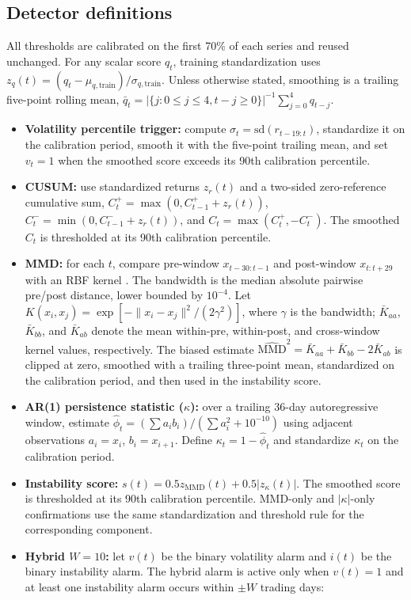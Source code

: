 \documentclass[pdflatex,sn-mathphys-num]{sn-jnl}
\begin{document}
\subsection{Detector definitions}
All thresholds are calibrated on the first 70\% of each series and reused unchanged. For any scalar score $q_t$, training standardization uses $z_q(t)=(q_t-\mu_{q,\mathrm{train}})/\sigma_{q,\mathrm{train}}$. Unless otherwise stated, smoothing is a trailing five-point rolling mean, $\bar q_t=|\{j:0\leq j\leq4,t-j\geq0\}|^{-1}\sum_{j=0}^{4}q_{t-j}$.
\begin{itemize}
\item \textbf{Volatility percentile trigger:} compute $\sigma_t=\mathrm{sd}(r_{t-19:t})$, standardize it on the calibration period, smooth it with the five-point trailing mean, and set $v_t=1$ when the smoothed score exceeds its 90th calibration percentile.
\item \textbf{CUSUM:} use standardized returns $z_r(t)$ and a two-sided zero-reference cumulative sum, $C_t^+=\max(0,C_{t-1}^+ + z_r(t))$, $C_t^-=\min(0,C_{t-1}^- + z_r(t))$, and $C_t=\max(C_t^+,-C_t^-)$. The smoothed $C_t$ is thresholded at its 90th calibration percentile.
\item \textbf{MMD:} for each $t$, compare pre-window $x_{t-30:t-1}$ and post-window $x_{t:t+29}$ with an RBF kernel \cite{gretton2012}. The bandwidth is the median absolute pairwise pre/post distance, lower bounded by $10^{-4}$. Let $K(x_i,x_j)=\exp[-\|x_i-x_j\|^2/(2\gamma^2)]$, where $\gamma$ is the bandwidth; $\bar K_{aa}$, $\bar K_{bb}$, and $\bar K_{ab}$ denote the mean within-pre, within-post, and cross-window kernel values, respectively. The biased estimate $\widehat{\mathrm{MMD}}^2=\bar K_{aa}+\bar K_{bb}-2\bar K_{ab}$ is clipped at zero, smoothed with a trailing three-point mean, standardized on the calibration period, and then used in the instability score.
\item \textbf{AR(1) persistence statistic ($\kappa$):} over a trailing 36-day autoregressive window, estimate $\widehat\phi_t=(\sum a_i b_i)/(\sum a_i^2+10^{-10})$ using adjacent observations $a_i=x_i$, $b_i=x_{i+1}$. Define $\kappa_t=1-\widehat\phi_t$ and standardize $\kappa_t$ on the calibration period.
\item \textbf{Instability score:} $s(t)=0.5z_{\mathrm{MMD}}(t)+0.5|z_\kappa(t)|$. The smoothed score is thresholded at its 90th calibration percentile. MMD-only and $|\kappa|$-only confirmations use the same standardization and threshold rule for the corresponding component.
\item \textbf{Hybrid $W=10$:} let $v(t)$ be the binary volatility alarm and $i(t)$ be the binary instability alarm. The hybrid alarm is active only when $v(t)=1$ and at least one instability alarm occurs within $\pm W$ trading days:

\end{itemize}
\end{document}
